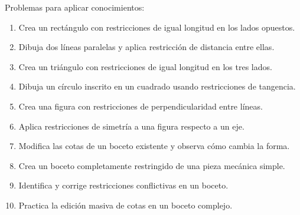 Problemas para aplicar conocimientos:
\begin{enumerate}
	\item Crea un rectángulo con restricciones de igual
	      longitud en los lados opuestos.
	\item Dibuja dos líneas paralelas y aplica restricción
	      de distancia entre ellas.
	\item Crea un triángulo con restricciones de igual
	      longitud en los tres lados.
	\item Dibuja un círculo inscrito en un cuadrado usando
	      restricciones de tangencia.
	\item Crea una figura con restricciones de perpendicularidad
	      entre líneas.
	\item Aplica restricciones de simetría a una figura
	      respecto a un eje.
	\item Modifica las cotas de un boceto existente y
	      observa cómo cambia la forma.
	\item Crea un boceto completamente restringido de una
	      pieza mecánica simple.
	\item Identifica y corrige restricciones conflictivas
	      en un boceto.
	\item Practica la edición masiva de cotas en un boceto
	      complejo.
\end{enumerate}